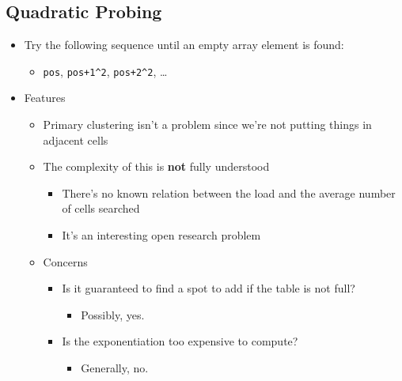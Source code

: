 \documentclass[
  10pt,
  english,
  letterpaper,
,tablecaptionabove
]{scrartcl}
\newcommand{\passthrough}[1]{#1}
\providecommand{\tightlist}{%
  \setlength{\itemsep}{0pt}\setlength{\parskip}{0pt}}
\begin{document}
\hypertarget{quadratic-probing}{%
\subsection{Quadratic Probing}\label{quadratic-probing}}

\begin{itemize}
\tightlist
\item
  Try the following sequence until an empty array element is found:

  \begin{itemize}
  \tightlist
  \item
    \passthrough{\lstinline!pos!}, \passthrough{\lstinline!pos+1^2!},
    \passthrough{\lstinline!pos+2^2!}, \ldots{}
  \end{itemize}
\item
  Features

  \begin{itemize}
  \tightlist
  \item
    Primary clustering isn't a problem since we're not putting things in
    adjacent cells
  \item
    The complexity of this is \textbf{not} fully understood

    \begin{itemize}
    \tightlist
    \item
      There's no known relation between the load and the average number
      of cells searched
    \item
      It's an interesting open research problem
    \end{itemize}
  \item
    Concerns

    \begin{itemize}
    \tightlist
    \item
      Is it guaranteed to find a spot to add if the table is not full?

      \begin{itemize}
      \tightlist
      \item
        Possibly, yes.
      \end{itemize}
    \item
      Is the exponentiation too expensive to compute?

      \begin{itemize}
      \tightlist
      \item
        Generally, no.
      \end{itemize}
    \end{itemize}
  \end{itemize}
\end{itemize}
\end{document}
